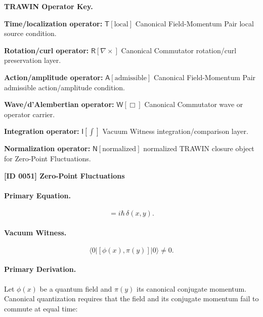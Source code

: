 \par\vspace{0.45\baselineskip}
\noindent\begin{minipage}[t]{\linewidth}
\begingroup
\small
\raggedright
\textbf{TRAWIN Operator Key.}\par
\noindent\textbf{Time/localization operator:} $\mathsf{T}\!\left[\mathrm{local}\right]$ Canonical Field-Momentum Pair local source condition.\par
\noindent\textbf{Rotation/curl operator:} $\mathsf{R}\!\left[\nabla\times\right]$ Canonical Commutator rotation/curl preservation layer.\par
\noindent\textbf{Action/amplitude operator:} $\mathsf{A}\!\left[\mathrm{admissible}\right]$ Canonical Field-Momentum Pair admissible action/amplitude condition.\par
\noindent\textbf{Wave/d'Alembertian operator:} $\mathsf{W}\!\left[\Box\right]$ Canonical Commutator wave or operator carrier.\par
\noindent\textbf{Integration operator:} $\mathsf{I}\!\left[\int\right]$ Vacuum Witness integration/comparison layer.\par
\noindent\textbf{Normalization operator:} $\mathsf{N}\!\left[\mathrm{normalized}\right]$ normalized TRAWIN closure object for Zero-Point Fluctuations.\par
\endgroup
\end{minipage}

\clearpage
\noindent\textbf{[ID 0051] Zero-Point Fluctuations}\par
\vspace{0.35em}
\paragraph{Primary Equation.}
\begin{equation}
[\phi(x),\pi(y)] = i\hbar\,\delta(x,y).
\end{equation}

\paragraph{Vacuum Witness.}
\begin{equation}
\langle 0|[\phi(x),\pi(y)]|0\rangle \neq 0 .
\end{equation}

\paragraph{Primary Derivation.}
Let $\phi(x)$ be a quantum field and $\pi(y)$ its canonical conjugate momentum.  
Canonical quantization requires that the field and its conjugate momentum fail to commute at equal time:


